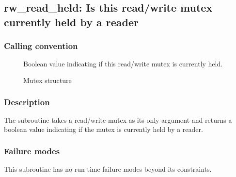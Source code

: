\clearpage
{}
{}
\label{subr:rw_read_held}
\subsection*{rw\_read\_held: Is this read/write mutex currently held by
  a reader}

\subsubsection*{Calling convention}

\begin{description}
\item[] Boolean value indicating if this read/write
  mutex is currently held.
\item[] Mutex structure
\end{description}

\subsubsection*{Description}

The  subroutine takes a read/write mutex as its
only argument and returns a boolean value indicating if the mutex is
currently held by a reader.

\subsubsection*{Failure modes}

This subroutine has no run-time failure modes beyond its constraints.
